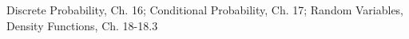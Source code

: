 \documentclass[handout]{mcs}
\begin{document}
\renewcommand{\reading}
{Chapter~\bref{probability_chap}.\ \emph{Discrete Probability}.
 Chapter~\bref{chap:cond_prob}.\ \emph{Conditional Probability}.
 Chapter~\bref{ran_var_chap}.\ \emph{Random Variables, Density Functions}. }



\begin{staffnotes}
Discrete Probability, Ch. 16; Conditional Probability, Ch. 17;
Random Variables, Density Functions, Ch. 18-18.3
\end{staffnotes}






\end{document}
